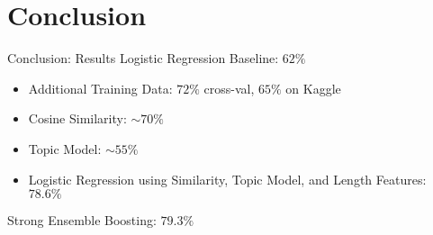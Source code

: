 \documentclass{beamer}
\begin{document}

\section{Conclusion}
\begin{frame}{Conclusion: Results}
Logistic Regression Baseline: {\color{red}$62\%$}
    \begin{itemize}
        \item Additional Training Data: {\color{blue}$72\%$} cross-val, {\color{blue}$65\%$} on Kaggle
        \item Cosine Similarity: {\color{blue}$\sim 70\%$}
        \item Topic Model: {\color{blue}$\sim 55\%$}
        \item Logistic Regression using Similarity, Topic Model, and Length Features: {\color{blue}$78.6\%$}
    \end{itemize}
Strong Ensemble Boosting: {\color{green}$79.3\%$}

\end{frame}
\end{document}
